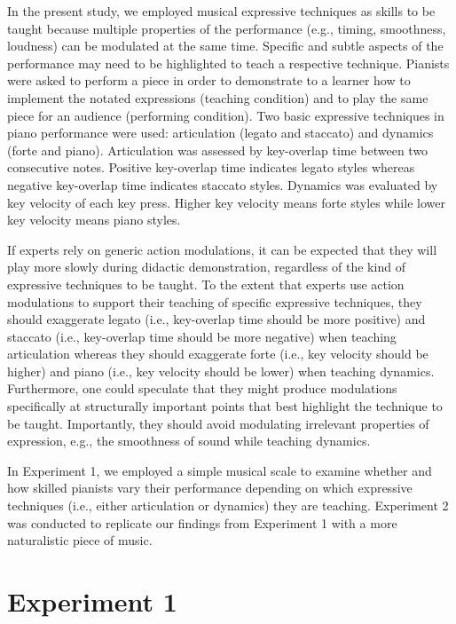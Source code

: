 \documentclass[
  english,
  man,floatsintext]{apa6}
\begin{document}
In the present study, we employed musical expressive techniques as skills to be taught because multiple properties of the performance (e.g., timing, smoothness, loudness) can be modulated at the same time. Specific and subtle aspects of the performance may need to be highlighted to teach a respective technique. Pianists were asked to perform a piece in order to demonstrate to a learner how to implement the notated expressions (teaching condition) and to play the same piece for an audience (performing condition). Two basic expressive techniques in piano performance were used: articulation (legato and staccato) and dynamics (forte and piano). Articulation was assessed by key-overlap time between two consecutive notes. Positive key-overlap time indicates legato styles whereas negative key-overlap time indicates staccato styles. Dynamics was evaluated by key velocity of each key press. Higher key velocity means forte styles while lower key velocity means piano styles.

If experts rely on generic action modulations, it can be expected that they will play more slowly during didactic demonstration, regardless of the kind of expressive techniques to be taught. To the extent that experts use action modulations to support their teaching of specific expressive techniques, they should exaggerate legato (i.e., key-overlap time should be more positive) and staccato (i.e., key-overlap time should be more negative) when teaching articulation whereas they should exaggerate forte (i.e., key velocity should be higher) and piano (i.e., key velocity should be lower) when teaching dynamics. Furthermore, one could speculate that they might produce modulations specifically at structurally important points that best highlight the technique to be taught. Importantly, they should avoid modulating irrelevant properties of expression, e.g., the smoothness of sound while teaching dynamics.

In Experiment 1, we employed a simple musical scale to examine whether and how skilled pianists vary their performance depending on which expressive techniques (i.e., either articulation or dynamics) they are teaching. Experiment 2 was conducted to replicate our findings from Experiment 1 with a more naturalistic piece of music.

\hypertarget{experiment-1}{%
\section{Experiment 1}\label{experiment-1}}
\end{document}
